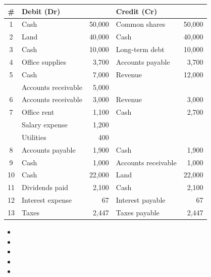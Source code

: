 \begin{example}
\begin{center}
\begin{tabular}{clrlr}
        \toprule
        \# & Debit (Dr) & & Credit (Cr) & \\
        \midrule
        1 & Cash & 50,000 & Common shares & 50,000 \\
        2 & Land & 40,000 & Cash & 40,000 \\
        3 & Cash & 10,000 & Long-term debt & 10,000 \\
        4 & Office supplies & 3,700 & Accounts payable & 3,700 \\
        5 & Cash & 7,000 & Revenue & 12,000 \\
          & Accounts receivable & 5,000 & & \\
        6 & Accounts receivable & 3,000 & Revenue & 3,000 \\
        7 & Office rent & 1,100 & Cash & 2,700 \\
          & Salary expense & 1,200 & & \\
          & Utilities & 400 & & \\
        8 & Accounts payable & 1,900 & Cash & 1,900 \\
        9 & Cash & 1,000 & Accounts receivable & 1,000 \\
        10 & Cash & 22,000 & Land & 22,000 \\
        11 & Dividends paid & 2,100 & Cash & 2,100 \\
        12 & Interest expense & 67 & Interest payable & 67 \\
        13 & Taxes & 2,447 & Taxes payable & 2,447 \\
        \bottomrule
    \end{tabular}
    \end{center}
    \begin{itemize}
        \item {}
        \item {}
        \item {}
        \item {}
        \item {}

\end{itemize}
\end{example}
